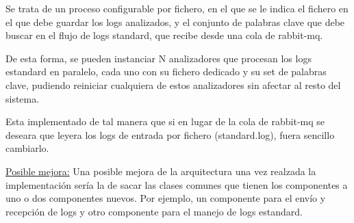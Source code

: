 \documentclass[11pt]{article}
\begin{document}
Se trata de un proceso configurable por fichero, en el que se le indica el fichero en el que debe guardar los logs analizados, y el conjunto de palabras clave que debe buscar en el flujo de logs standard, que recibe desde una cola de rabbit-mq.

De esta forma, se pueden instanciar N analizadores que procesan los logs estandard en paralelo, cada uno con su fichero dedicado y su set de palabras clave, pudiendo reiniciar cualquiera de estos analizadores sin afectar al resto del sistema.

Esta implementado de tal manera que si en lugar de la cola de rabbit-mq se deseara que leyera los logs de entrada por fichero (standard.log), fuera sencillo cambiarlo.

\underline{Posible mejora:} Una posible mejora de la arquitectura una vez realzada la implementación sería la de sacar las clases comunes que tienen los componentes a uno o dos componentes nuevos. Por ejemplo, un componente para el envío y recepción de logs y otro componente para el manejo de logs estandard.
\end{document}
